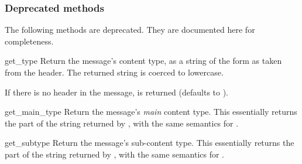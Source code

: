 \subsubsection{Deprecated methods}


The following methods are deprecated.  They are documented here for
completeness.

\begin{methoddesc}[Message]{get_type}{}
Return the message's content type, as a string of the form
 as taken from the
 header.
The returned string is coerced to lowercase.

If there is no  header in the message,
 is returned (defaults to ).

\end{methoddesc}

\begin{methoddesc}[Message]{get_main_type}{}
Return the message's \emph{main} content type.  This essentially returns the
 part of the string returned by , with the
same semantics for .

\end{methoddesc}

\begin{methoddesc}[Message]{get_subtype}{}
Return the message's sub-content type.  This essentially returns the
 part of the string returned by , with the
same semantics for .

\end{methoddesc}

